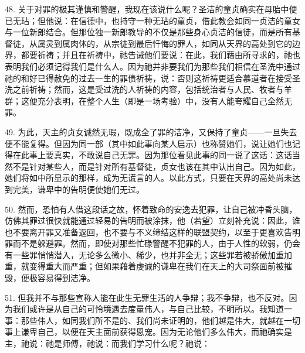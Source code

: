48. 关于对罪的极其谨慎和警醒，我现在该说什么呢？圣洁的童贞确实在母胎中便已无玷；但他说：在信德中，也持守一种无玷的童贞，借此教会如同一贞洁的童女与一位新郎结合。但那位独一新郎教导的不仅是那些身心贞洁的信徒，而是所有基督徒，从属灵到属肉体的，从宗徒到最后忏悔的罪人，如同从天界的高处到它的边界，都要祈祷；并且在祈祷中，祂告诫他们要说：在此，我们藉由所寻求的，祂也表明我们必须记得我们是什么人。因为祂并非要我们为那些我们相信在圣洗中通过祂的和好已得赦免的过去一生的罪债祈祷，说：否则这祈祷更适合慕道者在接受圣洗之前祈祷；然而，这是受过洗的人祈祷的内容，包括统治者与人民、牧者与羊群；这便充分表明，在整个人生（即是一场考验）中，没有人能夸耀自己全然无罪。\par

49. 为此，天主的贞女诚然无瑕，既成全了罪的洁净，又保持了童贞——一旦失去便不能复得。但因为同一部（其中如此事向某人启示）也称赞她们，说让她们也记得在此事上要真实，不敢说自己无罪。因为那位看见此事的同一说了这话：这话当然不是针对某些人，而是针对所有基督徒，贞女也该在其中认出自己。因为如此，她们将如中所显示的那样，成为无谎言的人。以此方式，只要在天界的高处尚未达到完美，谦卑中的告明便使她们无过。\par

50. 然而，恐怕有人借这段话之故，怀着致命的安逸去犯罪，让自己被冲昏头脑，仿佛其罪过很快就能通过轻易的告明而被涂抹，他（若望）立刻补充说：因此，谁也不要离开罪又准备返回，也不要与不义缔结这样的联盟契约，以至于更喜欢告明罪而不是躲避罪。然而，即使对那些忙碌警醒不犯罪的人，由于人性的软弱，仍会有一些罪悄悄潜入，无论多么微小、稀少，也并非全无；这些罪若被骄傲加重加重，就变得重大而严重；但如果藉着虔诚的谦卑在我们在天上的大司祭面前被摧毁，便极容易得到洁净。\par

51. 但我并不与那些宣称人能在此生无罪生活的人争辩；我不争辩，也不反对。因为我们或许是从自己的可怜境遇去度量伟人，与自己比较，不明所以。我知道一事：那些伟人，如同我们所不是的、我们尚未证明的，他们越是伟大，就越在一切事上谦卑自己，以便在天主面前获得恩宠。因为无论他们多么伟大，而祂确实是主，祂说：祂是师傅，祂说：而我们学习什么呢？祂说：\par

